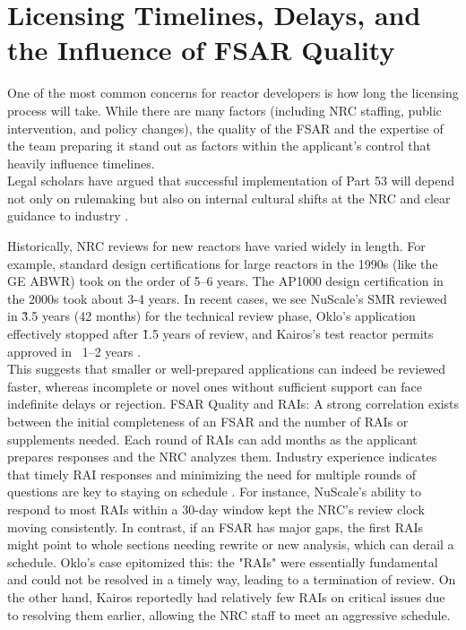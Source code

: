 \documentclass[5p,authoryear]{elsarticle}
\begin{document}
\section{Licensing Timelines, Delays, and the Influence of FSAR Quality}

One of the most common concerns for reactor developers is how long the licensing process will take. While there are many factors (including NRC staffing, public intervention, and policy changes), the quality of the FSAR and the expertise of the team preparing it stand out as factors within the applicant’s control that heavily influence timelines. \\

Legal scholars have argued that successful implementation of Part 53 will depend not only on rulemaking but also on internal cultural shifts at the NRC and clear guidance to industry \cite{Righetti2025}.

Historically, NRC reviews for new reactors have varied widely in length. For example, standard design certifications for large reactors in the 1990s (like the GE ABWR) took on the order of 5–6 years. The AP1000 design certification in the 2000s took about 3-4 years. In recent cases, we see NuScale's SMR reviewed in \~3.5 years (42 months) for the technical review phase, Oklo's application effectively stopped after \~1.5 years of review, and Kairos's test reactor permits approved in ~1–2 years \cite{GAIN2024}.\\ 

This suggests that smaller or well-prepared applications can indeed be reviewed faster, whereas incomplete or novel ones without sufficient support can face indefinite delays or rejection. FSAR Quality and RAIs: A strong correlation exists between the initial completeness of an FSAR and the number of RAIs or supplements needed. Each round of RAIs can add months as the applicant prepares responses and the NRC analyzes them. Industry experience indicates that timely RAI responses and minimizing the need for multiple rounds of questions are key to staying on schedule \cite{NIA2024}. For instance, NuScale's ability to respond to most RAIs within a 30-day window kept the NRC's review clock moving consistently. In contrast, if an FSAR has major gaps, the first RAIs might point to whole sections needing rewrite or new analysis, which can derail a schedule. Oklo's case epitomized this: the "RAIs" were essentially fundamental and could not be resolved in a timely way, leading to a termination of review. On the other hand, Kairos reportedly had relatively few RAIs on critical issues due to resolving them earlier, allowing the NRC staff to meet an aggressive schedule. 
\end{document}
